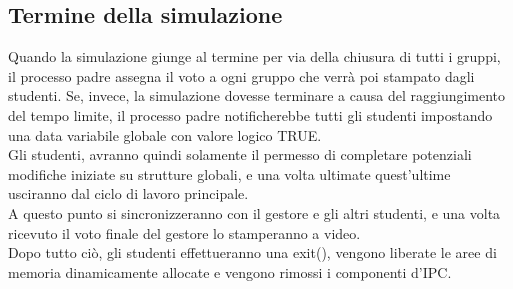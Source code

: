 \documentclass[a4paper,11pt]{article}
\newcommand{\cambiaFont}[2]{{\fontencoding{T1}\fontfamily{#1}%
\selectfont#2}}
\begin{document}
\subsection{Termine della simulazione}
Quando la simulazione giunge al termine per via della chiusura di tutti i gruppi, il processo padre assegna il voto a ogni gruppo che verrà poi stampato dagli studenti.
Se, invece, la simulazione dovesse terminare a causa del raggiungimento del tempo limite, il processo padre notificherebbe tutti gli studenti impostando una data variabile globale con valore logico \cambiaFont{pcr}{TRUE}. \\
Gli studenti, avranno quindi solamente il permesso di completare potenziali modifiche
iniziate su strutture globali, e una volta ultimate quest’ultime usciranno dal ciclo di lavoro principale. \\
A questo punto si sincronizzeranno con il gestore e gli altri studenti, e una volta ricevuto il voto finale del gestore lo stamperanno a video. \\
Dopo tutto ciò, gli studenti effettueranno una \cambiaFont{pcr}{exit()}, vengono liberate le aree di memoria dinamicamente allocate e vengono rimossi i componenti d’IPC. 
\end{document}
